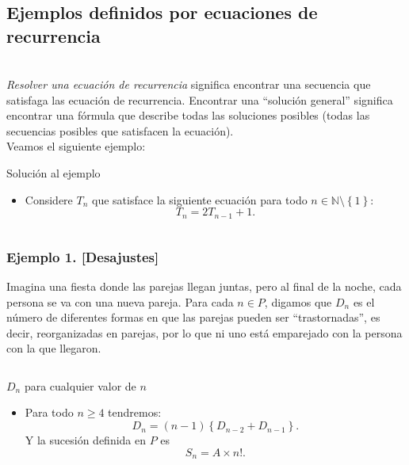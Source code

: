 \subsection{Ejemplos definidos por ecuaciones de recurrencia}

\begin{frame}
\frametitle{\subsecname}

\begin{columns}
	\begin{column}{\textwidth}
	\textit{Resolver una ecuación de recurrencia} significa encontrar una secuencia que satisfaga las ecuación de recurrencia. Encontrar una ``solución general'' significa encontrar una fórmula que describe todas las soluciones posibles (todas las secuencias posibles que satisfacen la ecuación).\\
	Veamos el siguiente ejemplo:
	
	\begin{block}{Solución al ejemplo}
		\begin{itemize}
			\item Considere $T_{n}$ que satisface la siguiente ecuación para todo $n \in\mathds{N}\setminus\left\{1\right\}$: \[ T_{n}=2T_{n-1}+1. \]
		\end{itemize}
	\end{block}

\end{column}
\end{columns}
\end{frame}

\begin{frame}
\frametitle{Ejemplo 1. [Desajustes]}
Imagina una fiesta donde las parejas llegan juntas, pero al final de la noche, cada persona se va con una nueva pareja. Para cada $n\in P$, digamos que $D_{n}$ es el número de diferentes formas en que las parejas pueden ser ``trastornadas'', es decir, reorganizadas en parejas, por lo que ni uno está emparejado con la persona con la que llegaron.

\begin{columns}
	\begin{column}{\textwidth}
		\begin{block}{$D_{n}$ para cualquier valor de $n$}
			\begin{itemize}
			\item Para todo $n \geq 4$ tendremos: \[ D_{n}=(n-1)\left\{D_{n-2}+D_{n-1}\right\}. \] Y la sucesión definida en $P$ es \[ S_{n} = A \times n!. \]
			\end{itemize}
		\end{block}
	\end{column}
\end{columns}
\end{frame}

